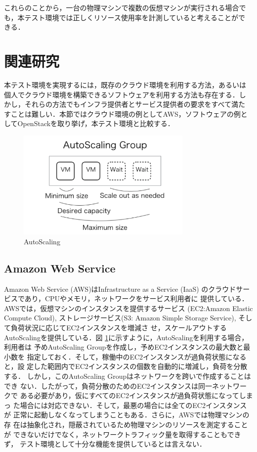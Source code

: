 \documentclass[submit,techrep]{ipsj}
\begin{document}
これらのことから，一台の物理マシンで複数の仮想マシンが実行される場合で
も，本テスト環境では正しくリソース使用率を計測していると考えることがで
きる．


\section{関連研究}
本テスト環境を実現するには，既存のクラウド環境を利用する方法，あるいは
個人でクラウド環境を構築できるソフトウェアを利用する方法も存在する．し
かし，それらの方法でもインフラ提供者とサービス提供者の要求をすべて満た
すことは難しい．本節ではクラウド環境の例としてAWS，ソフトウェアの例と
してOpenStackを取り挙げ，本テスト環境と比較する．


\begin{figure}[tb]
	\includegraphics[width=8.5cm,bb=0 0 513 320]{fig/autoscaling.png}
	\caption{AutoScaling}
	\label{fig:autoscaling}
\end{figure}



\subsection{Amazon Web Service}
Amazon Web Service (AWS)\cite{aws}はInfrastructure as a Service (IaaS)
のクラウドサービスであり，CPUやメモリ，ネットワークをサービス利用者に
提供している．AWSでは，仮想マシンのインスタンスを提供するサービス
(EC2:Amazon Elastic Compute Cloud), ストレージサービス(S3: Amazon
Simple Storage Service), そして負荷状況に応じてEC2インスタンスを増減さ
せ，スケールアウトするAutoScalingを提供している．図
\ref{fig:autoscaling}に示すように，AutoScalingを利用する場合，利用者は
予めAutoScaling Groupを作成し，予めEC2インスタンスの最大数と最小数を
指定しておく．そして，稼働中のEC2インスタンスが過負荷状態になると，設
定した範囲内でEC2インスタンスの個数を自動的に増減し，負荷を分散する．
しかし，このAutoScaling Groupはネットワークを跨いで作成することはでき
ない．したがって，負荷分散のためのEC2インスタンスは同一ネットワークで
ある必要があり，仮にすべてのEC2インスタンスが過負荷状態になってしまっ
た場合には対応できない．そして，最悪の場合には全てのEC2インスタンスが
正常に起動しなくなってしまうこともある．さらに，AWSでは物理マシンの存
在は抽象化され，隠蔽されているため物理マシンのリソースを測定することが
できないだけでなく，ネットワークトラフィック量を取得することもできず，
テスト環境として十分な機能を提供しているとは言えない．
\end{document}
